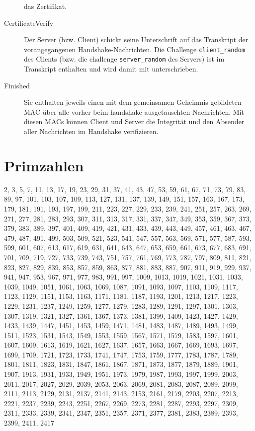 \documentclass[a4paper,landscape]{article}
\begin{document}
\begin{multicols*}{4}
\begin{description}
		      das Zertifikat.
		\item[CertificateVerify] Der Server (bzw. Client) schickt seine
		      Unterschrift auf das Transkript der vorangegangenen
		      Handshake-Nachrichten. Die Challenge \texttt{client\_random} des
		      Clients (bzw. die challenge \texttt{server\_random} des Servers)
		      ist im Transkript enthalten und wird damit mit unterschrieben.
		\item[Finished] Sie enthalten jeweils einen mit dem gemeinsamen
		      Geheimnis gebildeten MAC über alle vorher beim handshake ausgetauschten
		      Nachrichten. Mit diesen MACs können Client und Server die Integrität und
		      den Absender aller Nachrichten im Handshake verifizieren.
	\end{description}
	\columnbreak

	\section{Primzahlen}
	2, 3, 5, 7, 11, 13, 17, 19, 23, 29, 31, 37, 41, 43, 47, 53, 59, 61, 67, 71,
	73, 79, 83, 89, 97, 101, 103, 107, 109, 113, 127, 131, 137, 139, 149, 151,
	157, 163, 167, 173, 179, 181, 191, 193, 197, 199, 211, 223, 227, 229, 233,
	239, 241, 251, 257, 263, 269, 271, 277, 281, 283, 293, 307, 311, 313, 317,
	331, 337, 347, 349, 353, 359, 367, 373, 379, 383, 389, 397, 401, 409, 419,
	421, 431, 433, 439, 443, 449, 457, 461, 463, 467, 479, 487, 491, 499, 503,
	509, 521, 523, 541, 547, 557, 563, 569, 571, 577, 587, 593, 599, 601, 607,
	613, 617, 619, 631, 641, 643, 647, 653, 659, 661, 673, 677, 683, 691, 701,
	709, 719, 727, 733, 739, 743, 751, 757, 761, 769, 773, 787, 797, 809, 811,
	821, 823, 827, 829, 839, 853, 857, 859, 863, 877, 881, 883, 887, 907, 911,
	919, 929, 937, 941, 947, 953, 967, 971, 977, 983, 991, 997, 1009, 1013,
	1019, 1021, 1031, 1033, 1039, 1049, 1051, 1061, 1063, 1069, 1087, 1091,
	1093, 1097, 1103, 1109, 1117, 1123, 1129, 1151, 1153, 1163, 1171, 1181,
	1187, 1193, 1201, 1213, 1217, 1223, 1229, 1231, 1237, 1249, 1259, 1277,
	1279, 1283, 1289, 1291, 1297, 1301, 1303, 1307, 1319, 1321, 1327, 1361,
	1367, 1373, 1381, 1399, 1409, 1423, 1427, 1429, 1433, 1439, 1447, 1451,
	1453, 1459, 1471, 1481, 1483, 1487, 1489, 1493, 1499, 1511, 1523, 1531,
	1543, 1549, 1553, 1559, 1567, 1571, 1579, 1583, 1597, 1601, 1607, 1609,
	1613, 1619, 1621, 1627, 1637, 1657, 1663, 1667, 1669, 1693, 1697, 1699,
	1709, 1721, 1723, 1733, 1741, 1747, 1753, 1759, 1777, 1783, 1787, 1789,
	1801, 1811, 1823, 1831, 1847, 1861, 1867, 1871, 1873, 1877, 1879, 1889,
	1901, 1907, 1913, 1931, 1933, 1949, 1951, 1973, 1979, 1987, 1993, 1997,
	1999, 2003, 2011, 2017, 2027, 2029, 2039, 2053, 2063, 2069, 2081, 2083,
	2087, 2089, 2099, 2111, 2113, 2129, 2131, 2137, 2141, 2143, 2153, 2161,
	2179, 2203, 2207, 2213, 2221, 2237, 2239, 2243, 2251, 2267, 2269, 2273,
	2281, 2287, 2293, 2297, 2309, 2311, 2333, 2339, 2341, 2347, 2351, 2357,
	2371, 2377, 2381, 2383, 2389, 2393, 2399, 2411, 2417
\end{multicols*}
\end{document}
